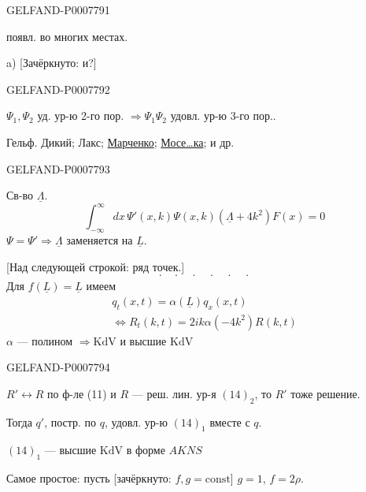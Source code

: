 \begin{GelfandAdjacentEvidence}{GELFAND-P000779}{1}

появл. во многих местах.

a) [Зачёркнуто: и?]
\end{GelfandAdjacentEvidence}
\begin{GelfandAdjacentEvidence}{GELFAND-P000779}{2}

\(\Psi_1,\Psi_2\) уд. ур-ю 2-го пор. \(\Rightarrow\Psi_1\Psi_2\) удовл. ур-ю 3-го пор..

Гельф. Дикий; Лакс; \underline{Марченко}; \underline{Мосе…ка}; и др.
\end{GelfandAdjacentEvidence}
\begin{GelfandAdjacentEvidence}{GELFAND-P000779}{3}


Св-во \(\underline\Lambda\).
\begin{equation}
\int_{-\infty}^\infty dx\,\Psi'(x,k)\Psi(x,k)(\underline\Lambda+4k^2)F(x)=0\tag{13}
\end{equation}
\(\Psi=\Psi'\Rightarrow\underline\Lambda\) заменяется на \(\underline L\).

[Над следующей строкой: ряд точек.]
\[
\cdot\quad\cdot\quad\cdot\quad\cdot\quad\cdot\quad\cdot
\]
Для \(f(\underline L)=\underline L\) имеем
\begin{equation}
\begin{gathered}
q_t(x,t)=\alpha(\underline L)q_x(x,t)\\
\Longleftrightarrow
R_t(k,t)=2ik\alpha(-4k^2)R(k,t)
\end{gathered}\tag{14}
\end{equation}
\(\alpha\) --- полином \(\Rightarrow\mathrm{KdV}\) и высшие \(\mathrm{KdV}\)
\end{GelfandAdjacentEvidence}
\begin{GelfandAdjacentEvidence}{GELFAND-P000779}{4}


\(R'\leftrightarrow R\) по ф-ле (11) и \(R\) --- реш. лин. ур-я \((14)_2\), то \(R'\) тоже решение.

Тогда \(q'\), постр. по \(q\), удовл. ур-ю \((14)_1\) вместе с \(q\).

\((14)_1\) --- высшие \(\mathrm{KdV}\) в форме \(AKNS\)

Самое простое: пусть [зачёркнуто: \(f,g=\mathrm{const}\)] \(g=1\), \(f=2\rho\).
\end{GelfandAdjacentEvidence}
